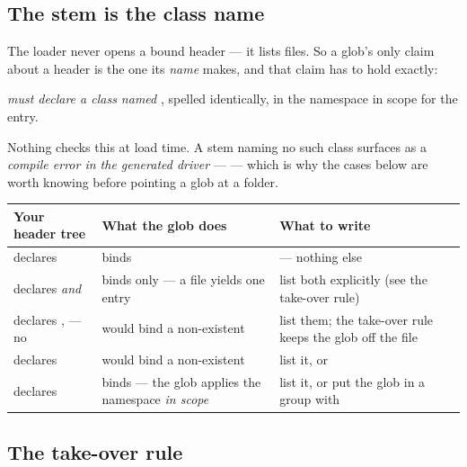 \subsection{The stem is the class name}

The loader never opens a bound header --- it lists files. So a glob's only claim
about a header is the one its \emph{name} makes, and that claim has to hold
exactly:

\begin{center}
\emph{ must declare a class named }, spelled
identically, in the namespace in scope for the entry.
\end{center}

Nothing checks this at load time. A stem naming no such class surfaces as a
\emph{compile error in the generated driver} ---  --- which is why the cases below are worth knowing before
pointing a glob at a folder.

\begin{center}
\small
\begin{tabular}{@{}L{3.9cm}L{3.7cm}L{5.2cm}@{}}
\toprule
\textbf{Your header tree} & \textbf{What the glob does} & \textbf{What to write} \\
\midrule
{} declares  & binds  &
   --- nothing else \\
\addlinespace
{} declares  \emph{and}  &
  binds  only --- a file yields one entry &
  list both explicitly (see the take-over rule) \\
\addlinespace
{} declares ,  --- no  &
  would bind a non-existent  &
  list them; the take-over rule keeps the glob off the file \\
\addlinespace
{} declares  &
  would bind a non-existent  &
  list it, or  \\
\addlinespace
{} declares  &
  binds  --- the glob applies the namespace \emph{in scope} &
  list it, or put the glob in a group with  \\
\bottomrule
\end{tabular}
\end{center}

\subsection*{The take-over rule}

